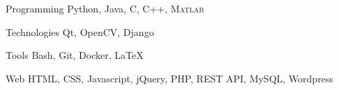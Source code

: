 

\begin{minipage}[]{0.4\textwidth}
  \vspace{2.0mm}

  \begin{cvskills}
    \cvskill
      {Programming}
      {Python, Java, C, C++, \textsc{Matlab}}

    \cvskill
      {Technologies}
      {Qt, OpenCV, Django}

    \cvskill
      {Tools}
      {Bash, Git, Docker, \LaTeX}

    \cvskill
      {Web}
      {HTML, CSS, Javascript, jQuery, PHP, REST API, MySQL, Wordpress}
  \end{cvskills}
\end{minipage}%
\begin{minipage}[]{0.6\textwidth}
  \hfill
\end{minipage}


